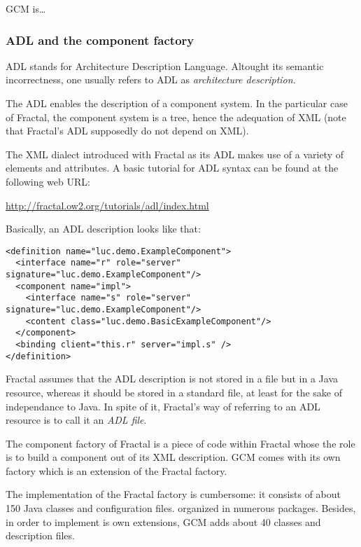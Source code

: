 \documentclass{article}
\newcommand{\urll}[1]{\begin{center}\url{#1}\end{center}}
\begin{document}
GCM is\ldots

\subsubsection{ADL and the component factory}


ADL stands for Architecture Description Language. Altought its semantic incorrectness, one usually refers to
ADL as \textit{architecture description}.

The ADL enables the description of a component system. In the particular case of Fractal,
the component system is a tree, hence the adequation of XML (note that Fractal's ADL supposedly do
 not depend on XML).

The XML dialect introduced with Fractal as its ADL makes use of a variety of
elements and attributes. 
A basic tutorial for ADL syntax can be found at the following web URL:
\urll{http://fractal.ow2.org/tutorials/adl/index.html}

Basically, an ADL description looks like that:
\begin{tiny}
\begin{lstlisting}
<definition name="luc.demo.ExampleComponent">
  <interface name="r" role="server" signature="luc.demo.ExampleComponent"/>
  <component name="impl">
    <interface name="s" role="server" signature="luc.demo.ExampleComponent"/>
    <content class="luc.demo.BasicExampleComponent"/>
  </component>
  <binding client="this.r" server="impl.s" />
</definition>
\end{lstlisting}
\end{tiny}


Fractal assumes that the ADL description
is not stored in a file but in a Java resource, whereas it should be stored in a standard file,
at least for the sake
of independance to Java. In spite of it, Fractal's way of referring to an ADL resource is to
call it an \textit{ADL file}.


The component factory of Fractal is a piece of code within Fractal whose the role  is to build a component out of its XML
description. 
GCM comes with its own factory which is an extension of the Fractal factory.

The implementation of the Fractal factory is cumbersome: it consists of  about 150 Java classes and configuration files.
organized in numerous packages.
Besides, in order to implement is own extensions, GCM adds about 40 classes and description files.
\end{document}
